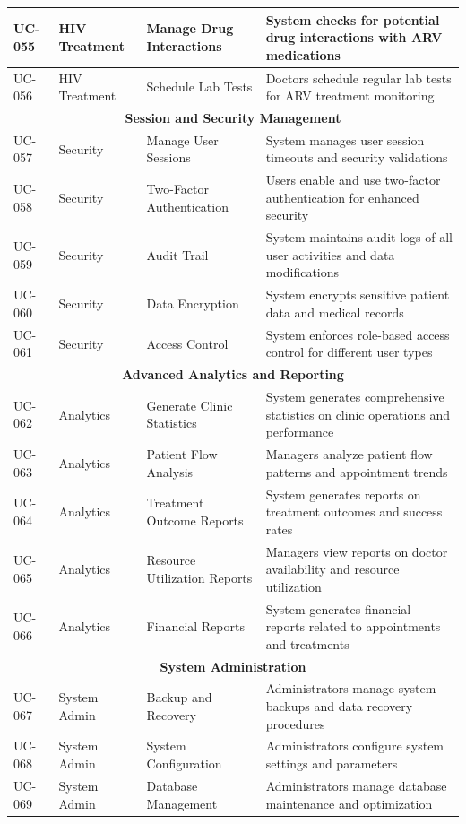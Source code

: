 \documentclass[12pt,a4paper]{article}
\begin{document}
\begin{longtable}{|p{1cm}|p{3cm}|p{3cm}|p{7cm}|}
\hline
UC-055 & HIV Treatment & Manage Drug Interactions & System checks for potential drug interactions with ARV medications \\
\hline
UC-056 & HIV Treatment & Schedule Lab Tests & Doctors schedule regular lab tests for ARV treatment monitoring \\
\hline
\multicolumn{4}{|c|}{\textbf{Session and Security Management}} \\
\hline
UC-057 & Security & Manage User Sessions & System manages user session timeouts and security validations \\
\hline
UC-058 & Security & Two-Factor Authentication & Users enable and use two-factor authentication for enhanced security \\
\hline
UC-059 & Security & Audit Trail & System maintains audit logs of all user activities and data modifications \\
\hline
UC-060 & Security & Data Encryption & System encrypts sensitive patient data and medical records \\
\hline
UC-061 & Security & Access Control & System enforces role-based access control for different user types \\
\hline
\multicolumn{4}{|c|}{\textbf{Advanced Analytics and Reporting}} \\
\hline
UC-062 & Analytics & Generate Clinic Statistics & System generates comprehensive statistics on clinic operations and performance \\
\hline
UC-063 & Analytics & Patient Flow Analysis & Managers analyze patient flow patterns and appointment trends \\
\hline
UC-064 & Analytics & Treatment Outcome Reports & System generates reports on treatment outcomes and success rates \\
\hline
UC-065 & Analytics & Resource Utilization Reports & Managers view reports on doctor availability and resource utilization \\
\hline
UC-066 & Analytics & Financial Reports & System generates financial reports related to appointments and treatments \\
\hline
\multicolumn{4}{|c|}{\textbf{System Administration}} \\
\hline
UC-067 & System Admin & Backup and Recovery & Administrators manage system backups and data recovery procedures \\
\hline
UC-068 & System Admin & System Configuration & Administrators configure system settings and parameters \\
\hline
UC-069 & System Admin & Database Management & Administrators manage database maintenance and optimization \\

\end{longtable}
\end{document}
